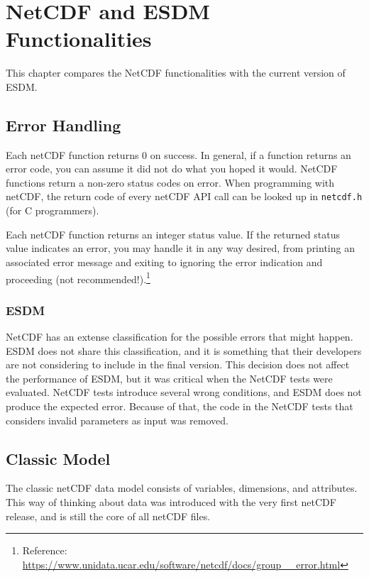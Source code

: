 \chapter{NetCDF and ESDM Functionalities}
\label{ch:func}

\tab
This chapter compares the NetCDF functionalities with the current version of ESDM.

\section{Error Handling}

\tab
Each netCDF function returns 0 on success. In general, if a function returns an error code, you can assume it did not do what you hoped it would. NetCDF functions return a non-zero status codes on error. When programming with netCDF, the return code of every netCDF API call can be looked up in \texttt{netcdf.h} (for C programmers).

Each netCDF function returns an integer status value. If the returned status value indicates an error, you may handle it in any way desired, from printing an associated error message and exiting to ignoring the error indication and proceeding (not recommended!).\footnote{Reference: \url{https://www.unidata.ucar.edu/software/netcdf/docs/group__error.html}}

\subsection{ESDM}

\tab
NetCDF has an extense classification for the possible errors that might happen. ESDM does not share this classification, and it is something that their developers are not considering to include in the final version. This decision does not affect the performance of ESDM, but it was critical when the NetCDF tests were evaluated. NetCDF tests introduce several wrong conditions, and ESDM does not produce the expected error. Because of that, the code in the NetCDF tests that considers invalid parameters as input was removed.

\section{Classic Model}

The classic netCDF data model consists of variables, dimensions, and attributes. This way of thinking about data was introduced with the very first netCDF release, and is still the core of all netCDF files.

